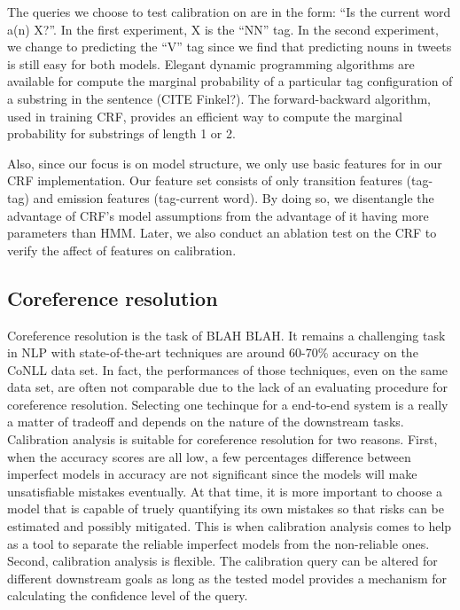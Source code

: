 The queries we choose to test calibration on are in the form: ``Is the current word a(n) X?''. In the first experiment, X is the ``NN'' tag. In the second experiment, we change to predicting the ``V'' tag since we find that predicting nouns in tweets is still easy for both models. Elegant dynamic programming algorithms are available for compute the marginal probability of a particular tag configuration of a substring in the sentence (CITE Finkel?). The forward-backward algorithm, used in training CRF, provides an efficient way to compute the marginal probability for substrings of length 1 or 2.  

Also, since our focus is on model structure, we only use basic features for in our CRF implementation. Our feature set consists of only transition features (tag-tag) and emission features (tag-current word). By doing so, we disentangle the advantage of CRF's model assumptions from the advantage of it having more parameters than HMM. Later, we also conduct an ablation test on the CRF to verify the affect of features on calibration. 

\subsection{Coreference resolution}

Coreference resolution is the task of BLAH BLAH. It remains a challenging task in NLP with state-of-the-art techniques are around 60-70\% accuracy on the CoNLL data set. In fact, the performances of those techniques, even on the same data set, are often not comparable due to the lack of an evaluating procedure for coreference resolution. Selecting one techinque for a end-to-end system is a really a matter of tradeoff and depends on the nature of the downstream tasks. Calibration analysis is suitable for coreference resolution for two reasons. First, when the accuracy scores are all low, a few percentages difference between imperfect models in accuracy are not significant since the models will make unsatisfiable mistakes eventually. At that time, it is more important to choose a model that is capable of truely quantifying its own mistakes so that risks can be estimated and possibly mitigated. This is when calibration analysis comes to help as a tool to separate the reliable imperfect models from the non-reliable ones. Second, calibration analysis is flexible. The calibration query can be altered for different downstream goals as long as the tested model provides a mechanism for calculating the confidence level of the query. 

